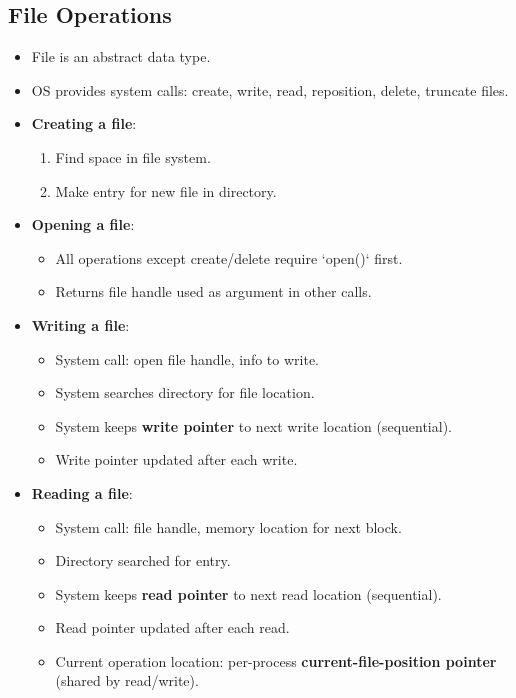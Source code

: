 \subsection*{File Operations}
\begin{itemize}
    \item File is an abstract data type.
    \item OS provides system calls: create, write, read, reposition, delete, truncate files.
    \item \textbf{Creating a file}:
    \begin{enumerate}
        \item Find space in file system.
        \item Make entry for new file in directory.
    \end{enumerate}
    \item \textbf{Opening a file}:
    \begin{itemize}
        \item All operations except create/delete require `open()` first.
        \item Returns file handle used as argument in other calls.
    \end{itemize}
    \item \textbf{Writing a file}:
    \begin{itemize}
        \item System call: open file handle, info to write.
        \item System searches directory for file location.
        \item System keeps \textbf{write pointer} to next write location (sequential).
        \item Write pointer updated after each write.
    \end{itemize}
    \item \textbf{Reading a file}:
    \begin{itemize}
        \item System call: file handle, memory location for next block.
        \item Directory searched for entry.
        \item System keeps \textbf{read pointer} to next read location (sequential).
        \item Read pointer updated after each read.
        \item Current operation location: per-process \textbf{current-file-position pointer} (shared by read/write).
    \end{itemize}

\end{itemize}
